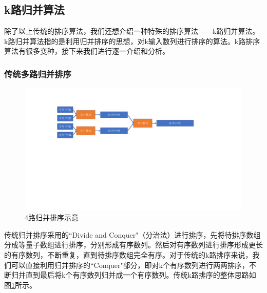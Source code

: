 \subsection{k路归并算法}
除了以上传统的排序算法，我们还想介绍一种特殊的排序算法——k路归并算法。k路归并算法指的是利用归并排序的思想，对k输入数列进行排序的算法。k路排序算法有很多变种，接下来我们进行逐一介绍和分析。
\subsubsection{传统多路归并排序}
\begin{figure}[htbp]
    \centering
    \includegraphics[width=\linewidth]{figures/traditional k way sort.pdf}
    \caption{4路归并排序示意}
    \label{fig:traditional_k_way_sort}
\end{figure}
传统归并排序采用的``Divide and Conquer"（分治法）进行排序，先将待排序数组分成等量子数组进行排序，分别形成有序数列。然后对有序数列进行排序形成更长的有序数列，不断重复，直到待排序数组完全有序。对于传统的k路排序来说，我们可以直接利用归并排序的``Conquer"部分，即对k个有序数列进行两两排序，不断归并直到最后将k个有序数列归并成一个有序数列。传统k路排序的整体思路如图\ref{fig:traditional_k_way_sort}所示。

